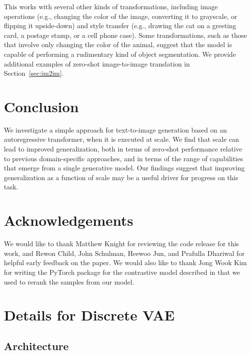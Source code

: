 \documentclass{article}
\begin{document}
This works with several other kinds of transformations, including image operations (e.g., changing the color of the image, converting it to grayscale, or flipping it upside-down) and style transfer (e.g., drawing the cat on a greeting card, a postage stamp, or a cell phone case). Some transformations, such as those that involve only changing the color of the animal, suggest that the model is capable of performing a rudimentary kind of object segmentation. We provide additional examples of zero-shot image-to-image translation in Section~\ref{sec:im2im}.

\section{Conclusion}

We investigate a simple approach for text-to-image generation based on an autoregressive transformer, when it is executed at scale. We find that scale can lead to improved generalization, both in terms of zero-shot performance relative to previous domain-specific approaches, and in terms of the range of capabilities that emerge from a single generative model. Our findings suggest that improving generalization as a function of scale may be a useful driver for progress on this task.



\section*{Acknowledgements}

We would like to thank Matthew Knight for reviewing the code release for this work, and Rewon Child, John Schulman, Heewoo Jun, and Prafulla Dhariwal for helpful early feedback on the paper. We would also like to thank Jong Wook Kim for writing the PyTorch package for the contrastive model described in \citet{radford2019language} that we used to rerank the samples from our model.




\newpage\appendix\onecolumn
\section{Details for Discrete VAE}

\subsection{Architecture}
\label{sec:dvae_arch}
\end{document}
